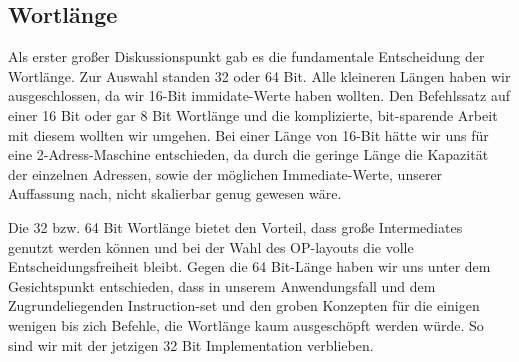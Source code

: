 \documentclass[paper=a4,fontsize=12pt,twocolumn]{scrreprt}
\begin{document}
\kant[6]

\subsection{Wortlänge}

Als erster großer Diskussionspunkt gab es die fundamentale Entscheidung der Wortlänge.
Zur Auswahl standen 32 oder 64 Bit. Alle kleineren Längen haben wir ausgeschlossen, da wir 16-Bit immidate-Werte haben wollten.
Den Befehlssatz auf einer 16 Bit oder gar 8 Bit Wortlänge und die komplizierte, bit-sparende Arbeit mit diesem wollten wir umgehen.
Bei einer Länge von 16-Bit hätte wir uns für eine 2-Adress-Maschine entschieden, da durch die geringe Länge die Kapazität der einzelnen Adressen, sowie der möglichen Immediate-Werte, unserer Auffassung nach, nicht skalierbar genug gewesen wäre. %

Die 32 bzw. 64 Bit Wortlänge bietet den Vorteil, dass große Intermediates genutzt werden können und bei der Wahl des OP-layouts die volle Entscheidungsfreiheit bleibt.
Gegen die 64 Bit-Länge haben wir uns unter dem Gesichtspunkt entschieden, dass in unserem Anwendungsfall und dem Zugrundeliegenden Instruction-set und den groben Konzepten für die einigen wenigen bis zich Befehle, die Wortlänge kaum ausgeschöpft werden würde. %
So sind wir mit der jetzigen 32 Bit Implementation verblieben.

\end{document}
